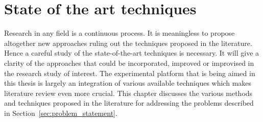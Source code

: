 \chapter{State of the art techniques}

\label{Chapter3} %

 Research in any field is a continuous process. It is meaningless to propose altogether new approaches ruling out the techniques proposed in the literature. Hence a careful study of the state-of-the-art techniques is necessary. It will give a clarity of the approaches that could be incorporated, improved or improvised in the research study of interest. The experimental platform that is being aimed in this thesis is largely an integration of various available techniques which makes literature review even more crucial. This chapter discusses the various methods and techniques proposed in the literature for addressing the problems described in Section~\ref{sec:problem_statement}.
